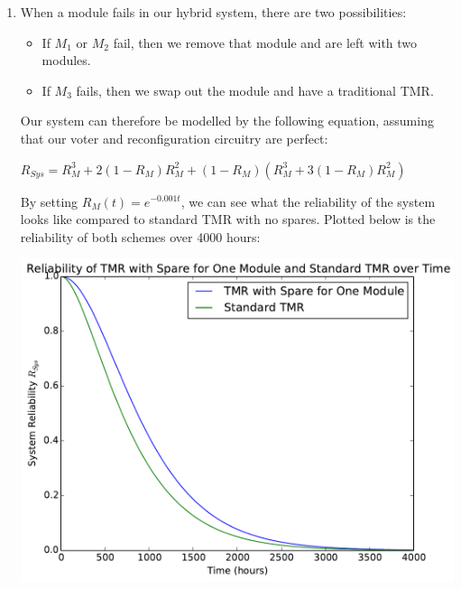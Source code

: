 \documentclass[a4paper,12pt]{article}
\begin{document}
\begin{enumerate}
        \item When a module fails in our hybrid system, there are two possibilities:

        \begin{itemize}
            \item If $M_1$ or $M_2$ fail, then we remove that module and are left with two modules.
            \item If $M_3$ fails, then we swap out the module and have a traditional TMR.
        \end{itemize}

        Our system can therefore be modelled by the following equation, assuming that our voter and reconfiguration circuitry are perfect:

        $R_{Sys} = R_M^3 + 2(1 - R_M)R_M^2 + (1 - R_M)(R_M^3 + 3(1 - R_M)R_M^2)$

        By setting $R_M(t) = e^{-0.001t}$, we can see what the reliability of the system looks like compared to standard TMR with no spares. Plotted below is the reliability of both schemes over 4000 hours:

        \begin{center}
            \includegraphics[scale=0.7]{question_7_graph}
        \end{center}

    \end{enumerate}
\end{document}
